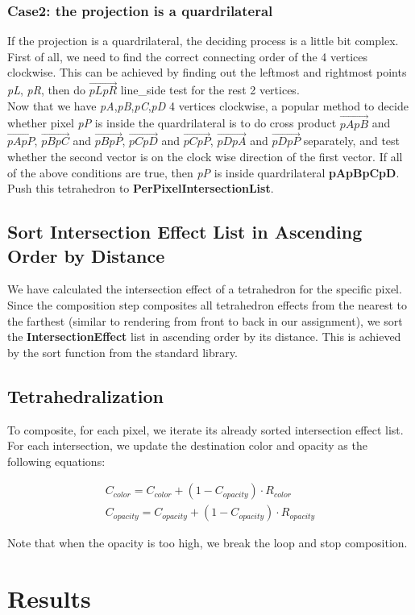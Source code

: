 \documentclass[acmtog]{acmart}
\begin{document}
\subsubsection{Case2: the projection is a quardrilateral}
If the projection is a quardrilateral, the deciding process is a little bit complex. First of all, we need to find the correct connecting order of the 4 vertices clockwise. This can be achieved by finding out the leftmost and rightmost points \emph{pL}, \emph{pR}, then do $\overrightarrow{pLpR}$ line\_side test for the rest 2 vertices.
\\Now that we have \emph{pA},\emph{pB},\emph{pC},\emph{pD} 4 vertices clockwise, a popular method to decide whether pixel \emph{pP} is inside the quardrilateral is to do cross product $\overrightarrow{pApB}$ and $\overrightarrow{pApP}$, $\overrightarrow{pBpC}$ and $\overrightarrow{pBpP}$, $\overrightarrow{pCpD}$ and $\overrightarrow{pCpP}$, $\overrightarrow{pDpA}$ and $\overrightarrow{pDpP}$ separately, and test whether the second vector is on the clock wise direction of the first vector. If all of the above conditions are true, then \emph{pP} is inside quardrilateral \textbf{pApBpCpD}. Push this tetrahedron to \textbf{PerPixelIntersectionList}.
\\
\subsection{Sort Intersection Effect List in Ascending Order by Distance}
We have calculated the intersection effect of a tetrahedron for the specific pixel. Since the composition step composites all tetrahedron effects from the nearest to the farthest (similar to rendering from front to back in our assignment), we sort the \textbf{IntersectionEffect} list in ascending order by its distance. This is achieved by the sort function from the standard library.
\\
\subsection{Tetrahedralization}
To composite, for each pixel, we iterate its already sorted intersection effect list.
For each intersection, we update the destination color and opacity as the following equations:

\begin{gather} 
C_{color} = C_{color} + (1 - C_{opacity}) \cdot R_{color}\\
C_{opacity} = C_{opacity} + (1 - C_{opacity}) \cdot R_{opacity}
\end{gather}

Note that when the opacity is too high, we break the loop and stop composition.




\section{Results}
\end{document}
